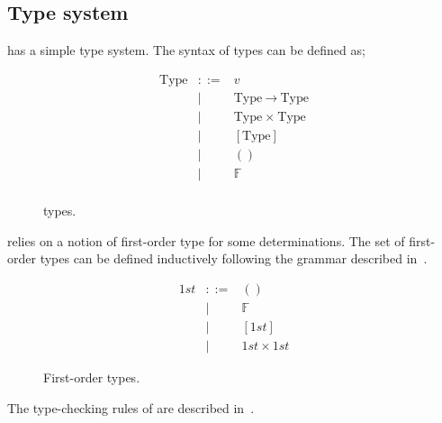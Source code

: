 \documentclass[
    9pt,            
    techreport,       
    affiltop,       
]{art}
\begin{document}
\subsection{Type system}\label{sec:type-system}

\VampIR{} has a simple type system. The syntax of types can be defined as;

\begin{figure}[H]
\begin{equation*}
\begin{array}{rcl}
    \text{Type} &::= &v \\
    &|  &\text{Type} \ \xrightarrow{} \ \text{Type} \\
    &|  &\text{Type} \ \times \ \text{Type} \\
    &|  &[\text{Type}] \\
    &|  &() \\
    &|  &\mathbb{F} \\
\end{array}
\end{equation*}
\caption{\VampIR{} types.}
\label{fig:types}
\end{figure}

\noindent \VampIR{} relies on a notion of first-order type for some determinations. The set of first-order types can be defined inductively following the grammar
described in~.

\begin{figure}[H]
\begin{equation*}
\begin{array}{rcl}
1st &::= &() \\
    &| &\mathbb{F} \\
    &| &[1st] \\
    &| & 1st \times 1st
\end{array}
\end{equation*}
\caption{First-order types.}
\label{eq:first-order-type}
\end{figure}

\noindent The type-checking rules of \VampIR{} are described in~.
\end{document}
